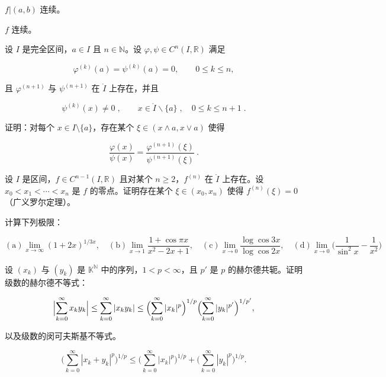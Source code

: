 \begin{exercises}
\begin{items}
\item

$ f|(a,b) $ 连续。

\item

$f$ 连续。

\end{items}

\item[15.]

设 $ I $ 是完全区间，$ a \in I $ 且 $ n \in \mathbb{N} $。设 $ \varphi, \psi \in C^n(I, \mathbb{R}) $ 满足

\[
\varphi^{(k)}(a)=\psi^{(k)}(a)=0,\qquad0\leq k\leq n,
\]

且 $ \varphi^{(n+1)} $ 与 $ \psi^{(n+1)} $ 在 $ \mathring{I} $ 上存在，并且

\[
\psi^{(k)}(x)\neq0\;,\qquad x\in\mathring{I}\backslash\{a\}\;,\quad0\leq k\leq n+1\;.
\]

证明：对每个 $ x \in I \setminus \{a\} $，存在某个 $ \xi \in (x \land a, x \lor a) $ 使得

\[
\frac{\varphi(x)}{\psi(x)}=\frac{\varphi^{(n+1)}(\xi)}{\psi^{(n+1)}(\xi)}~.
\]
\item[16.]

设 $I$ 是区间，$f \in C^{n-1}(I, \mathbb{R})$ 且对某个 $n \geq 2$，$f^{(n)}$ 在 $\mathring{I}$ 上存在。设 $x_0 < x_1 < \cdots < x_n$ 是 $f$ 的零点。证明存在某个 $\xi \in (x_0, x_n)$ 使得 $f^{(n)}(\xi) = 0$（广义罗尔定理）。

\item[17.]

计算下列极限：

\[
\mathrm{(a)}\operatorname*{l i m}_{x\to\infty}(1+2x)^{1/3x},\quad\mathrm{(b)}\operatorname*{l i m}_{x\to1}\frac{1+\cos\pi x}{x^{2}-2x+1},\quad\mathrm{(c)}\operatorname*{l i m}_{x\to0}\frac{\log\cos3x}{\log\cos2x},\quad\mathrm{(d)}\operatorname*{l i m}_{x\to0}\biggl(\frac{1}{\sin^{2}x}-\frac{1}{x^{2}}\biggr)
\]
\item[18.]

设 $ (x_k) $ 与 $ (y_k) $ 是 $ \mathbb{K}^{\mathbb{N}} $ 中的序列，$ 1 < p < \infty $，且 $ p' $ 是 $ p $ 的赫尔德共轭。证明级数的赫尔德不等式：

\[
\Bigl|\sum_{k=0}^{\infty}x_{k}y_{k}\Bigr|\leq\sum_{k=0}^{\infty}|x_{k}y_{k}|\leq\Bigl(\sum_{k=0}^{\infty}|x_{k}|^{p}\Bigr)^{1/p}\Bigl(\sum_{k=0}^{\infty}|y_{k}|^{p^{\prime}}\Bigr)^{1/p^{\prime}},
\]

以及级数的闵可夫斯基不等式。

\[
\Big(\sum_{k=0}^{\infty}|x_{k}+y_{k}|^{p}\Big)^{1/p}\leq\Big(\sum_{k=0}^{\infty}|x_{k}|^{p}\Big)^{1/p}+\Big(\sum_{k=0}^{\infty}|y_{k}|^{p}\Big)^{1/p}.
\]
\item[19.]


\end{exercises}
